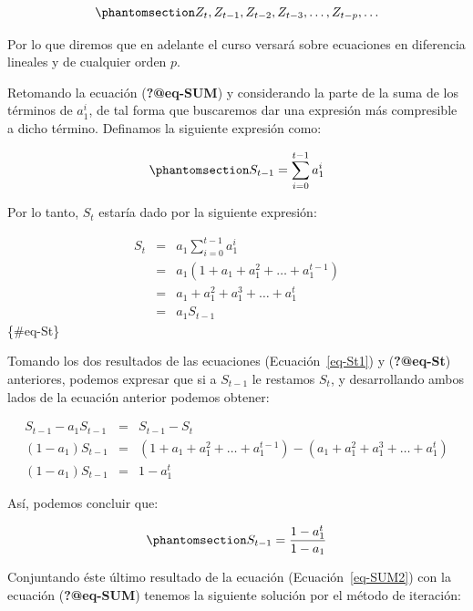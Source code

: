 \documentclass[
  a4paper,
]{article}
\begin{document}
\begin{equation}\phantomsection\label{eq-SUM0}{
    Z_t, Z_{t-1}, Z_{t-2}, Z_{t-3}, \ldots, Z_{t-p}, \ldots
}\end{equation}

Por lo que diremos que en adelante el curso versará sobre ecuaciones en
diferencia lineales y de cualquier orden \(p\).

Retomando la ecuación (\textbf{?@eq-SUM}) y considerando la parte de la
suma de los términos de \(a^i_1\), de tal forma que buscaremos dar una
expresión más compresible a dicho término. Definamos la siguiente
expresión como:

\begin{equation}\phantomsection\label{eq-St1}{
    S_{t-1} = \sum^{t-1}_{i = 0}{a^i_1}
}\end{equation}

Por lo tanto, \(S_t\) estaría dado por la siguiente expresión:

\begin{eqnarray}
S_{t} & = & a_1 \sum^{t-1}_{i = 0}{a^i_1} \nonumber \\
      & = & a_1 (1 + a_1 + a^2_1 + \ldots + a^{t-1}_1) \nonumber \\
      & = & a_1 + a^2_1 + a^3_1 + \ldots + a^{t}_1 \nonumber \\
      & = & a_1 S_{t-1}
\end{eqnarray} \{\#eq-St\}

Tomando los dos resultados de las ecuaciones (Ecuación~\ref{eq-St1}) y
(\textbf{?@eq-St}) anteriores, podemos expresar que si a \(S_{t-1}\) le
restamos \(S_t\), y desarrollando ambos lados de la ecuación anterior
podemos obtener:

\begin{eqnarray}
    S_{t-1} - a_1 S_{t-1} & = & S_{t-1} - S_{t} \nonumber \\
    (1 - a_1) S_{t-1} & = & (1 + a_1 + a^2_1 + \ldots + a^{t-1}_1) - (a_1 + a^2_1 + a^3_1 + \ldots + a^{t}_1) \nonumber \\
    (1 - a_1) S_{t-1} & = & 1 - a^{t}_1 \nonumber
\end{eqnarray}

Así, podemos concluir que:

\begin{equation}\phantomsection\label{eq-SUM2}{
    S_{t-1} = \frac{1 - a^{t}_1}{1 - a_1}
}\end{equation}

Conjuntando éste último resultado de la ecuación
(Ecuación~\ref{eq-SUM2}) con la ecuación (\textbf{?@eq-SUM}) tenemos la
siguiente solución por el método de iteración:
\end{document}
